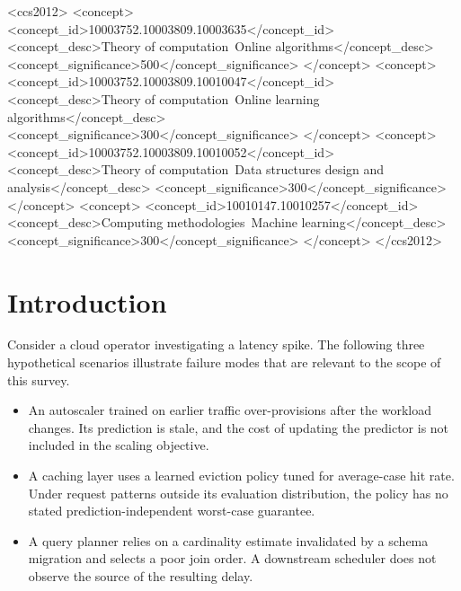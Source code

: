\documentclass[acmsmall,screen,nonacm]{acmart}
\theoremstyle{acmdefinition}%
\begin{document}
%
%
%
%
\begin{CCSXML}
<ccs2012>
<concept>
<concept_id>10003752.10003809.10003635</concept_id>
<concept_desc>Theory of computation~Online algorithms</concept_desc>
<concept_significance>500</concept_significance>
</concept>
<concept>
<concept_id>10003752.10003809.10010047</concept_id>
<concept_desc>Theory of computation~Online learning algorithms</concept_desc>
<concept_significance>300</concept_significance>
</concept>
<concept>
<concept_id>10003752.10003809.10010052</concept_id>
<concept_desc>Theory of computation~Data structures design and analysis</concept_desc>
<concept_significance>300</concept_significance>
</concept>
<concept>
<concept_id>10010147.10010257</concept_id>
<concept_desc>Computing methodologies~Machine learning</concept_desc>
<concept_significance>300</concept_significance>
</concept>
</ccs2012>
\end{CCSXML}


\maketitle

%
\section{Introduction}
\label{sec:intro}

Consider a cloud operator investigating a latency spike. The following three hypothetical scenarios illustrate failure modes that are relevant to the scope of this survey.

\begin{itemize}
    \item[\textbf{(S1)}] An autoscaler trained on earlier traffic over-provisions after the workload changes. Its prediction is stale, and the cost of updating the predictor is not included in the scaling objective.
    \item[\textbf{(S2)}] A caching layer uses a learned eviction policy tuned for average-case hit rate. Under request patterns outside its evaluation distribution, the policy has no stated prediction-independent worst-case guarantee.
    \item[\textbf{(S3)}] A query planner relies on a cardinality estimate invalidated by a schema migration and selects a poor join order. A downstream scheduler does not observe the source of the resulting delay.
\end{itemize}
\end{document}
